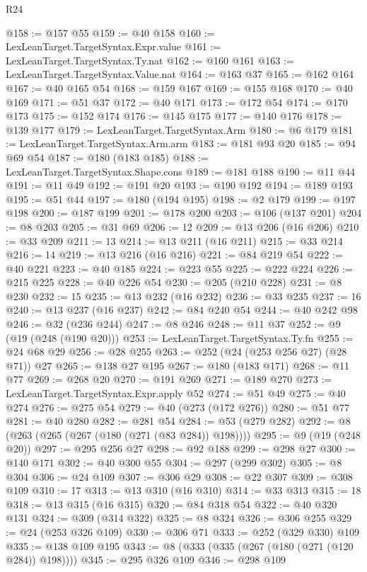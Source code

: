 \begin{lexlean}{R24}
\begin{coremodule}
@158 := @157 @55
@159 := @40 @158
@160 := LexLeanTarget.TargetSyntax.Expr.value
@161 := LexLeanTarget.TargetSyntax.Ty.nat
@162 := @160 @161
@163 := LexLeanTarget.TargetSyntax.Value.nat
@164 := @163 @37
@165 := @162 @164
@167 := @40 @165 @54
@168 := @159 @167
@169 := @155 @168
@170 := @40 @169
@171 := @51 @37
@172 := @40 @171
@173 := @172 @54
@174 := @170 @173
@175 := @152 @174
@176 := @145 @175
@177 := @140 @176
@178 := @139 @177
@179 := LexLeanTarget.TargetSyntax.Arm
@180 := @6 @179
@181 := LexLeanTarget.TargetSyntax.Arm.arm
@183 := @181 @93 @20
@185 := @94 @69 @54
@187 := @180 (@183 @185)
@188 := LexLeanTarget.TargetSyntax.Shape.cons
@189 := @181 @188
@190 := @11 @44
@191 := @11 @49
@192 := @191 @20
@193 := @190 @192
@194 := @189 @193
@195 := @51 @44
@197 := @180 (@194 @195)
@198 := @2 @179
@199 := @197 @198
@200 := @187 @199
@201 := @178 @200
@203 := @106 (@137 @201)
@204 := @8 @203
@205 := @31 @69
@206 := 12
@209 := @13 @206 (@16 @206)
@210 := @33 @209
@211 := 13
@214 := @13 @211 (@16 @211)
@215 := @33 @214
@216 := 14
@219 := @13 @216 (@16 @216)
@221 := @84 @219 @54
@222 := @40 @221
@223 := @40 @185
@224 := @223 @55
@225 := @222 @224
@226 := @215 @225
@228 := @40 @226 @54
@230 := @205 (@210 @228)
@231 := @8 @230
@232 := 15
@235 := @13 @232 (@16 @232)
@236 := @33 @235
@237 := 16
@240 := @13 @237 (@16 @237)
@242 := @84 @240 @54
@244 := @40 @242 @98
@246 := @32 (@236 @244)
@247 := @8 @246
@248 := @11 @37
@252 := @9 (@19 (@248 (@190 @20)))
@253 := LexLeanTarget.TargetSyntax.Ty.fn
@255 := @24 @68 @29
@256 := @28 @255
@263 := @252 (@24 (@253 @256 @27) (@28 @71)) @27
@265 := @138 @27 @195
@267 := @180 (@183 @171)
@268 := @11 @77
@269 := @268 @20
@270 := @191 @269
@271 := @189 @270
@273 := LexLeanTarget.TargetSyntax.Expr.apply @52
@274 := @51 @49
@275 := @40 @274
@276 := @275 @54
@279 := @40 (@273 (@172 @276))
@280 := @51 @77
@281 := @40 @280
@282 := @281 @54
@284 := @53 (@279 @282)
@292 := @8 (@263 (@265 (@267 (@180 (@271 (@83 @284)) @198))))
@295 := @9 (@19 (@248 @20))
@297 := @295 @256 @27
@298 := @92 @188
@299 := @298 @27
@300 := @140 @171
@302 := @40 @300 @55
@304 := @297 (@299 @302)
@305 := @8 @304
@306 := @24 @109
@307 := @306 @29
@308 := @22 @307
@309 := @308 @109
@310 := 17
@313 := @13 @310 (@16 @310)
@314 := @33 @313
@315 := 18
@318 := @13 @315 (@16 @315)
@320 := @84 @318 @54
@322 := @40 @320 @131
@324 := @309 (@314 @322)
@325 := @8 @324
@326 := @306 @255
@329 := @24 (@253 @326 @109)
@330 := @306 @71
@333 := @252 (@329 @330) @109
@335 := @138 @109 @195
@343 := @8 (@333 (@335 (@267 (@180 (@271 (@120 @284)) @198))))
@345 := @295 @326 @109
@346 := @298 @109

\end{coremodule}
\end{lexlean}

